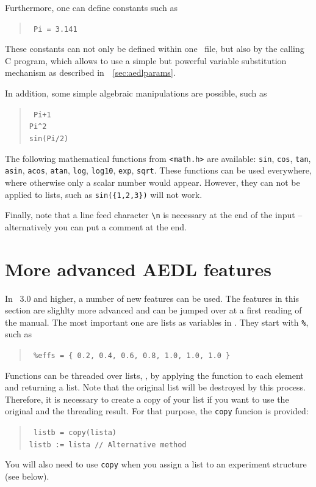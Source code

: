 Furthermore, one can define constants such as
\begin{quote}
{\tt
Pi = 3.141
}
\end{quote}
These constants can not only be defined within one \AEDL\ file, but also
by the calling C program, which allows to use a simple but powerful variable
substitution mechanism as described in~\Sec~\ref{sec:aedlparams}.

In addition, some simple algebraic manipulations are possible, such as
\begin{quote}
{\tt
Pi+1\\
\verb+Pi^2+\\
sin(Pi/2)
}
\end{quote}
The following mathematical functions from {\tt <math.h>} are available: 
{\tt sin}, {\tt cos}, {\tt tan}, {\tt asin}, {\tt acos}, {\tt atan}, 
{\tt log}, {\tt log10}, {\tt exp}, {\tt sqrt}.
% 
These functions can be used everywhere, where
otherwise only a scalar number would appear. However, they can not be
applied to lists, such as {\tt sin(\{1,2,3\})} will not work. 

Finally, note that a line feed character \verb+\n+ is necessary at
 the end of the input -- alternatively you can put a comment at the end.

\section{More advanced AEDL features}
\label{sec:advaedl}

In \GLOBES\ 3.0 and higher, a number of new features can be used. The
features in this section are slighlty more advanced and can be jumped over at a first reading of
the manual. The
most important one are lists as variables in \AEDL . They start with {\tt \%}, such as
\begin{quote}
{\tt
\%effs = \{ 0.2, 0.4, 0.6, 0.8, 1.0, 1.0, 1.0 \}
}
\end{quote}
Functions can be threaded over lists, \ie, by applying the function to each element
and returning a list. Note that the original list will be destroyed by this
process. Therefore, it is necessary to create a copy of your list if you want to
use the original and the threading result. For that purpose, the {\tt copy}
funcion is provided:
\begin{quote}
{\tt
 listb = copy(lista) \\
 listb := lista // Alternative method 
}
\end{quote}
You will also need to use {\tt copy} when you assign a list to an experiment structure (see below).

